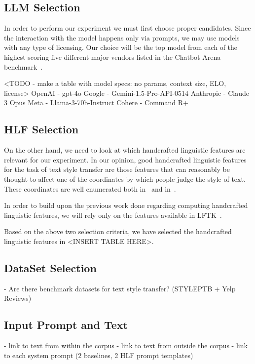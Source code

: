 \documentclass[runningheads,a4paper,11pt]{article}
\begin{document}
\subsection{LLM Selection}\label{llm-selection}

In order to perform our experiment we must first choose proper candidates.
Since the interaction with the model happens only via prompts, we may use models
with any type of licensing.
Our choice will be the top model from each of the highest scoring five different
major vendors listed in the Chatbot Arena benchmark~\cite{chiang2024chatbot}.

<TODO - make a table with model specs: no params, context size, ELO, license>
OpenAI - gpt-4o
Google - Gemini-1.5-Pro-API-0514
Anthropic - Claude 3 Opus
Meta - Llama-3-70b-Instruct
Cohere - Command R+

\subsection{HLF Selection}\label{hlf-selection}

On the other hand, we need to look at which handcrafted linguistic features are
relevant for our experiment.
In our opinion, good handcrafted linguistic features for the task of text style
transfer are those features that can reasonably be thought to affect one of the
coordinates by which people judge the style of text.
These coordinates are well enumerated both in~\cite{tst-review-2021} and
in~\cite{tst-survey-2022}.

In order to build upon the previous work done regarding computing handcrafted
linguistic features, we will rely only on the features available in
LFTK~\cite{lftk-2023}.

Based on the above two selection criteria, we have selected the handcrafted
linguistic features in <INSERT TABLE HERE>.

\subsection{DataSet Selection}\label{ds-selection}

- Are there benchmark datasets for text style transfer? (STYLEPTB + Yelp Reviews)

\subsection{Input Prompt and Text}\label{input-text}

- link to text from within the corpus
- link to text from outside the corpus
- link to each system prompt (2 baselines, 2 HLF prompt templates)
\end{document}

